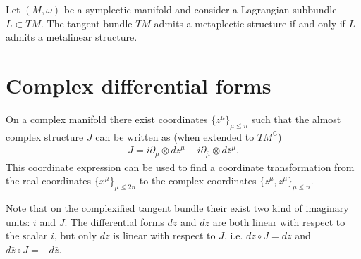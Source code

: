 
    \begin{property}\label{complex:metaplectic}
        Let $(M,\omega)$ be a symplectic manifold and consider a Lagrangian subbundle $L\subset TM$. The tangent bundle $TM$ admits a metaplectic structure if and only if $L$ admits a metalinear structure.
    \end{property}

\section{Complex differential forms}

    \begin{property}
        On a complex manifold there exist coordinates $\{z^\mu\}_{\mu\leq n}$ such that the almost complex structure $J$ can be written as (when extended to $TM^\mathbb{C}$)
        \begin{gather}
            \label{complex:complex_structure}
            J = i\partial_\mu\otimes dz^\mu - i\partial_{\overline\mu}\otimes d\overline{z}^\mu.
        \end{gather}
        This coordinate expression can be used to find a coordinate transformation from the real coordinates $\{x^\mu\}_{\mu\leq2n}$ to the complex coordinates $\{z^\mu,\overline{z}^\mu\}_{\mu\leq n}$.
    \end{property}
    \begin{remark}
        Note that on the complexified tangent bundle their exist two kind of imaginary units: $i$ and $J$. The differential forms $dz$ and $d\overline{z}$ are both linear with respect to the scalar $i$, but only $dz$ is linear with respect to $J$, i.e. $dz\circ J=dz$ and $d\overline{z}\circ J=-d\overline{z}$.
    \end{remark}


